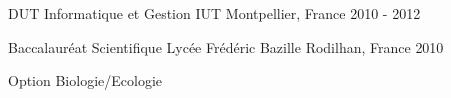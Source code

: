 \begin{cventries}
\cventry
{DUT Informatique et Gestion} %
{IUT} %
{Montpellier, France} %
{2010 - 2012} %
{}

\cventry
{Baccalauréat Scientifique} %
{Lycée Frédéric Bazille} %
{Rodilhan, France} %
{2010} %
{
  \begin{cvitems} %
    \item {Option Biologie/Ecologie}
  \end{cvitems}
}

\end{cventries}
